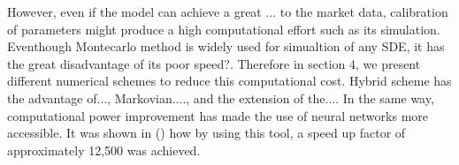\documentclass[12pt,oneside]{article}
\begin{document}
However, even if the model can achieve a great ... to the market data, calibration of parameters might produce a high computational effort such as its simulation. Eventhough Montecarlo method is widely used for simualtion of any SDE, it has the great disadvantage of its poor speed?. Therefore in section 4, we present different numerical schemes to reduce this computational cost. Hybrid scheme has the advantage of..., Markovian...., and the extension of the.... In the same way, computational power improvement has made the use of neural networks more accessible. It was shown in () how by using this tool, a speed up factor of approximately 12,500 was achieved.
\\







% 

\end{document}
